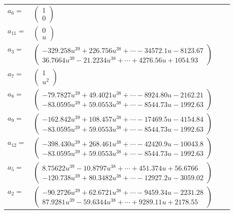 \documentclass[1p]{elsarticle_modified}
\theoremstyle{definition}
\begin{document}
\begin{tabular}{m{7pt} m{180pt} m{7pt} m{180pt} }
\flushright $a_{6}=$&$\begin{pmatrix}1\\0\end{pmatrix}$ \\
\flushright $a_{11}=$&$\begin{pmatrix}0\\u\end{pmatrix}$ \\
\flushright $a_{3}=$&$\begin{pmatrix}-329.258 u^{39}+226.756 u^{38}+\cdots-34572.1 u-8123.67\\36.7664 u^{39}-21.2234 u^{38}+\cdots+4276.56 u+1054.93\end{pmatrix}$ \\
\flushright $a_{7}=$&$\begin{pmatrix}1\\u^2\end{pmatrix}$ \\
\flushright $a_{8}=$&$\begin{pmatrix}-79.7827 u^{39}+49.4021 u^{38}+\cdots-8924.80 u-2162.21\\-83.0595 u^{39}+59.0553 u^{38}+\cdots-8544.73 u-1992.63\end{pmatrix}$ \\
\flushright $a_{9}=$&$\begin{pmatrix}-162.842 u^{39}+108.457 u^{38}+\cdots-17469.5 u-4154.84\\-83.0595 u^{39}+59.0553 u^{38}+\cdots-8544.73 u-1992.63\end{pmatrix}$ \\
\flushright $a_{12}=$&$\begin{pmatrix}-398.430 u^{39}+268.461 u^{38}+\cdots-42420.9 u-10043.8\\-83.0595 u^{39}+59.0553 u^{38}+\cdots-8544.73 u-1992.63\end{pmatrix}$ \\
\flushright $a_{5}=$&$\begin{pmatrix}8.75622 u^{39}-10.8797 u^{38}+\cdots+451.374 u+56.6766\\-120.738 u^{39}+80.3482 u^{38}+\cdots-12927.2 u-3059.02\end{pmatrix}$ \\
\flushright $a_{2}=$&$\begin{pmatrix}-90.2726 u^{39}+62.6721 u^{38}+\cdots-9459.34 u-2231.28\\87.9281 u^{39}-59.6344 u^{38}+\cdots+9289.11 u+2178.55\end{pmatrix}$ \\

\end{tabular}
\end{document}
